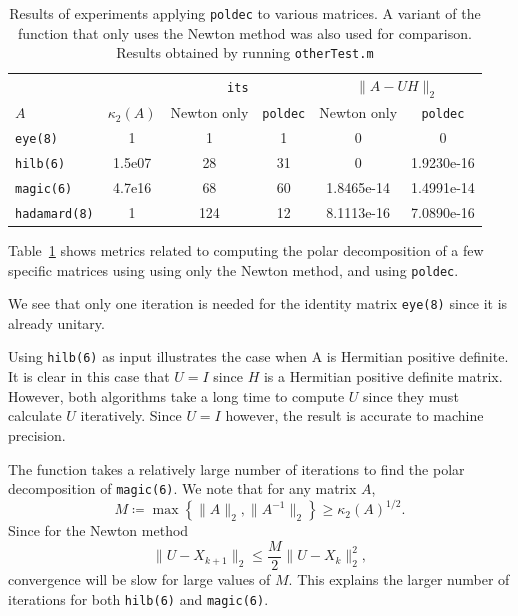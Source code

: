 \documentclass[10pt, A4paper]{article}
\begin{document}
\begin{table}[t]
	\centering
	\begin{tabular}{ l c c c c c }
		\toprule
		& & \multicolumn{2}{c}{\texttt{its}} & 
		\multicolumn{2}{c}{$\|A-UH\|_2$} \\
		\cmidrule(lr){3-4} \cmidrule(lr{12pt}){5-6}
		$A$ & $\kappa_2(A)$ & Newton only & \texttt{poldec} & Newton only 
		& 
		\texttt{poldec} \\
		\midrule
		\texttt{eye(8)} & 1 & 1 & 1 & 0 & 0 \\
		\texttt{hilb(6)} & 1.5e07 & 28 & 31 & 0 & 1.9230e-16 \\
		\texttt{magic(6)} & 4.7e16 & 68 & 60 & 1.8465e-14 & 
		1.4991e-14 \\
		\texttt{hadamard(8)} & 1 & 124 & 12 & 8.1113e-16 & 7.0890e-16\\
		\bottomrule
	\end{tabular}
	\caption{
	Results of experiments applying \texttt{poldec} 
	to	various matrices. A variant of the function that only uses the 
	Newton method was also used for comparison. Results obtained by 
	running \texttt{otherTest.m}
	\label{tab:poldecresults}}
\end{table}

Table~\ref{tab:poldecresults} shows metrics related to computing the 
polar decomposition of a few specific matrices using using only the 
Newton method, and using \texttt{poldec}.

We see that only one iteration is needed for the identity matrix 
\texttt{eye(8)} since it is already unitary.

Using \texttt{hilb(6)} as input illustrates the case when A is 
Hermitian 
positive definite.
It is clear in this case that $U = I$ since $H$ is a Hermitian positive 
definite matrix.
However, both algorithms take a long time to compute $U$ since they 
must calculate $U$ iteratively. Since $U = I$ however, the 
result is accurate to machine precision.

The function takes a relatively large number of iterations to find the 
polar decomposition of \texttt{magic(6)}. We note that for any matrix $A$,
$$M \coloneqq \max \left\{\|A\|_2, \|A^{-1}\|_2 \right\} \geq 
\kappa_2(A)^{1/2}.$$
Since for the Newton method
$$\|U - X_{k+1}\|_2 \leq \frac{M}{2} \|U - X_k\|_2^2,$$
convergence will be slow for large values of $M$.
This explains the larger number of iterations for both \texttt{hilb(6)} 
and \texttt{magic(6)}.
\end{document}
